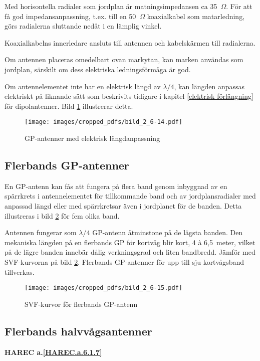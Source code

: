 Med horisontella radialer som jordplan är matningsimpedansen ca 35~\(\Omega\).
För att få god impedansanpassning, t.ex. till en 50~\(\Omega\) koaxialkabel
som matarledning, görs radialerna sluttande nedåt i en lämplig vinkel.

Koaxialkabelns innerledare ansluts till antennen och kabelskärmen till
radialerna.

Om antennen placeras omedelbart ovan markytan, kan marken användas som
jordplan, särskilt om dess elektriska ledningsförmåga är god.

Om antennelementet inte har en elektrisk längd av \(\lambda/4\), kan
längden anpassas elektriskt på liknande sätt som beskrivits tidigare i
kapitel \ref{elektrisk förlängning} för dipolantenner.
Bild \ref{fig:bildII6-14} illustrerar detta.

\begin{figure}
  \texttt{[image: images/cropped\_pdfs/bild\_2\_6-14.pdf]}
  \caption{GP-antenner med elektrisk längdanpassning}
  \label{fig:bildII6-14}
\end{figure}

\subsection{Flerbands GP-antenner}

En GP-antenn kan fås att fungera på flera band genom inbyggnad av en spärrkrets
i antennelementet för tillkommande band och av jordplansradialer med anpassad
längd eller med spärrkretsar även i jordplanet för de banden.
Detta illustreras i bild \ref{fig:bildII6-15} för fem olika band.

Antennen fungerar som \(\lambda/4\) GP-antenn åtminstone på de lägsta banden.
Den mekaniska längden på en flerbands GP för kortvåg blir kort, 4 à 6,5~meter,
vilket på de lägre banden innebär dålig verkningsgrad och liten bandbredd.
Jämför med SVF-kurvorna på bild \ref{fig:bildII6-15}.
Flerbands GP-antenner för upp till sju kortvågsband tillverkas.

\begin{figure}
  \texttt{[image: images/cropped\_pdfs/bild\_2\_6-15.pdf]}
  \caption{SVF-kurvor för flerbands GP-antenn}
  \label{fig:bildII6-15}
\end{figure}

\subsection{Flerbands halvvågsantenner}
\textbf{
HAREC a.\ref{HAREC.a.6.1.7}\label{myHAREC.a.6.1.7}
}
\label{W3DZZ}


